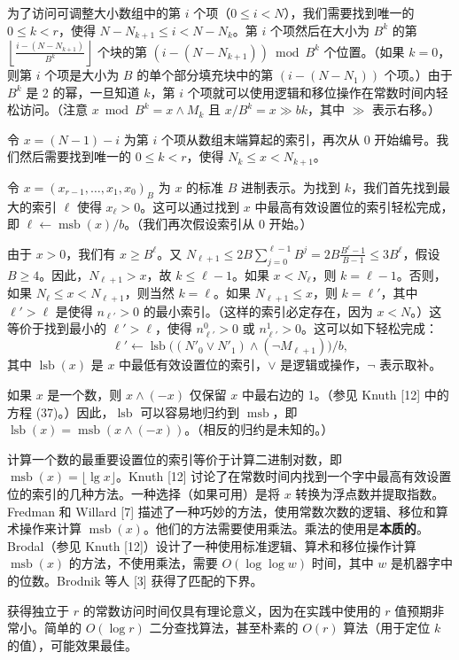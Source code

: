 \documentclass[12pt,a4paper]{ctexart}
\theoremstyle{remark}
\DeclareMathOperator{\msb}{msb}
\DeclareMathOperator{\lsb}{lsb}
\begin{document}
为了访问可调整大小数组中的第 $i$ 个项（$0\leq i<N$），我们需要找到唯一的 $0\leq k<r$，使得 $N-N_{k+1}\leq i<N-N_k$。第 $i$ 个项然后在大小为 $B^k$ 的第 $\left\lfloor\frac{i-(N-N_{k+1})}{B^k}\right\rfloor$ 个块的第 $(i-(N-N_{k+1}))\bmod B^k$ 个位置。（如果 $k=0$，则第 $i$ 个项是大小为 $B$ 的单个部分填充块中的第 $(i-(N-N_1))$ 个项。）由于 $B^k$ 是 2 的幂，一旦知道 $k$，第 $i$ 个项就可以使用逻辑和移位操作在常数时间内轻松访问。（注意 $x\bmod B^k = x \land M_k$ 且 $x/B^k = x \gg bk$，其中 $\gg$ 表示右移。）

令 $x=(N-1)-i$ 为第 $i$ 个项从数组末端算起的索引，再次从 0 开始编号。我们然后需要找到唯一的 $0\leq k<r$，使得 $N_k\leq x<N_{k+1}$。

令 $x=(x_{r-1},\ldots,x_1,x_0)_B$ 为 $x$ 的标准 $B$ 进制表示。为找到 $k$，我们首先找到最大的索引 $\ell$ 使得 $x_\ell>0$。这可以通过找到 $x$ 中最高有效设置位的索引轻松完成，即 $\ell\leftarrow\msb(x)/b$。（我们再次假设索引从 0 开始。）

由于 $x>0$，我们有 $x\geq B^\ell$。又 $N_{\ell+1} \leq 2B\sum_{j=0}^{\ell-1} B^j = 2B\frac{B^\ell-1}{B-1} \leq 3B^\ell$，假设 $B\geq 4$。因此，$N_{\ell+1}>x$，故 $k\leq\ell-1$。如果 $x<N_\ell$，则 $k=\ell-1$。否则，如果 $N_\ell\leq x<N_{\ell+1}$，则当然 $k=\ell$。如果 $N_{\ell+1}\leq x$，则 $k=\ell'$，其中 $\ell'>\ell$ 是使得 $n_{\ell'}>0$ 的最小索引。（这样的索引必定存在，因为 $x<N$。）这等价于找到最小的 $\ell'>\ell$，使得 $n^0_{\ell'}>0$ 或 $n^1_{\ell'}>0$。这可以如下轻松完成：
$$\ell' \leftarrow \lsb\big((N'_0 \lor N'_1) \land (\lnot M_{\ell+1})\big)/b,$$
其中 $\lsb(x)$ 是 $x$ 中最低有效设置位的索引，$\lor$ 是逻辑或操作，$\lnot$ 表示取补。

如果 $x$ 是一个数，则 $x\land(-x)$ 仅保留 $x$ 中最右边的 1。（参见 Knuth [12] 中的方程 (37)。）因此，$\lsb$ 可以容易地归约到 $\msb$，即 $\lsb(x) = \msb(x\land(-x))$。（相反的归约是未知的。）

计算一个数的最重要设置位的索引等价于计算二进制对数，即 $\msb(x)=\lfloor\lg x\rfloor$。Knuth [12] 讨论了在常数时间内找到一个字中最高有效设置位的索引的几种方法。一种选择（如果可用）是将 $x$ 转换为浮点数并提取指数。Fredman 和 Willard [7] 描述了一种巧妙的方法，使用常数次数的逻辑、移位和算术操作来计算 $\msb(x)$。他们的方法需要使用乘法。乘法的使用是\textbf{本质的}。Brodal（参见 Knuth [12]）设计了一种使用标准逻辑、算术和移位操作计算 $\msb(x)$ 的方法，不使用乘法，需要 $O(\log\log w)$ 时间，其中 $w$ 是机器字中的位数。Brodnik 等人 [3] 获得了匹配的下界。

获得独立于 $r$ 的常数访问时间仅具有理论意义，因为在实践中使用的 $r$ 值预期非常小。简单的 $O(\log r)$ 二分查找算法，甚至朴素的 $O(r)$ 算法（用于定位 $k$ 的值），可能效果最佳。
\end{document}
